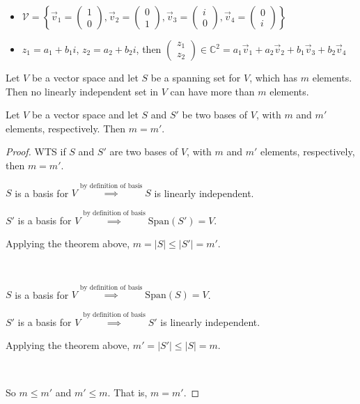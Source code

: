 \documentclass[11pt,fleqn]{book} %
\begin{document}
\begin{example}
\begin{itemize}
\begin{itemize}
            \item $\mathcal{V} = \left\{ \vec{v}_1 = \begin{pmatrix} 1\\0 \end{pmatrix}, \vec{v}_2 = \begin{pmatrix} 0\\1 \end{pmatrix}, \vec{v}_3 = \begin{pmatrix} i\\0 \end{pmatrix}, \vec{v}_4 = \begin{pmatrix} 0\\i \end{pmatrix} \right\}$
            \item $z_1 = a_1 + b_1i$, $z_2 = a_2+b_2i$, then $\begin{pmatrix} z_1\\z_2 \end{pmatrix} \in \mathbb{C}^2 = a_1\vec{v}_1 + a_2\vec{v}_2 + b_1\vec{v}_3 + b_2\vec{v}_4$
        \end{itemize}
    \end{itemize}
\end{example}

\setcounter{dummy}{9}
\begin{theorem}
    Let $V$ be a  vector space and let $S$ be a spanning set for $V$, which has $m$ elements. Then no linearly independent set in $V$ can have more than $m$ elements.
\end{theorem}

\begin{corollary}
    Let $V$ be a vector space and let $S$ and $S'$ be two bases of $V$, with $m$ and $m'$ elements, respectively. Then $m = m'$.
\end{corollary}

\begin{proof}
    WTS if $S$ and $S'$ are two bases of $V$, with $m$ and $m'$ elements, respectively, then $m = m'$.

    $S$ is a basis for $V \overset{\text{by definition of basis}}{\implies} S$ is linearly independent.

    $S'$ is a basis for $V \overset{\text{by definition of basis}}{\implies} \mathrm{Span}(S')=V$.

    Applying the theorem above, $m = |S| \le |S'| = m'$.

    {~~~}

    $S$ is a basis for $V \overset{\text{by definition of basis}}{\implies} \mathrm{Span}(S)=V$.

    $S'$ is a basis for $V \overset{\text{by definition of basis}}{\implies} S'$ is linearly independent.

    Applying the theorem above, $m' = |S'| \le |S| = m$.

    {~~~}

    So $m \le m'$ and $m' \le m$. That is, $m = m'$.
\end{proof}
\end{document}
